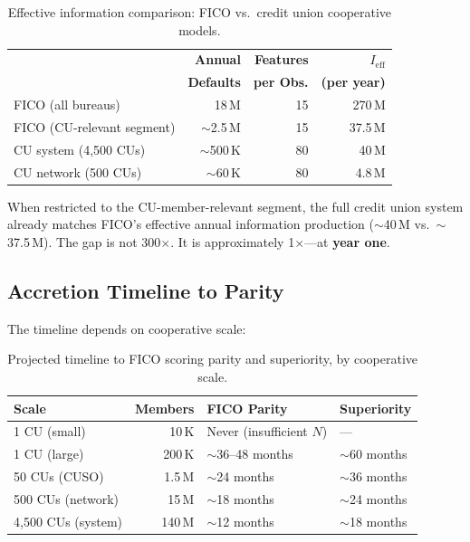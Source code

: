 \documentclass[11pt,twocolumn]{article}
\begin{document}
\begin{table}[H]
\centering
\small
\begin{tabular}{@{}lrrr@{}}
\toprule
 & \textbf{Annual} & \textbf{Features} & \textbf{$I_{\text{eff}}$} \\
 & \textbf{Defaults} & \textbf{per Obs.} & \textbf{(per year)} \\
\midrule
FICO (all bureaus)           & 18\,M   & 15  & 270\,M \\
FICO (CU-relevant segment)  & $\sim$2.5\,M  & 15  & 37.5\,M \\
CU system (4{,}500 CUs)     & $\sim$500\,K  & 80  & 40\,M \\
CU network (500 CUs)        & $\sim$60\,K   & 80  & 4.8\,M \\
\bottomrule
\end{tabular}
\caption{Effective information comparison: FICO vs.\ credit union cooperative models.}
\label{tab:ieff}
\end{table}

When restricted to the CU-member-relevant segment, the full credit union system already matches FICO's effective annual information production ($\sim$40\,M vs.\ $\sim$37.5\,M). The gap is not 300$\times$. It is approximately 1$\times$---at \textbf{year one}.

\subsection{Accretion Timeline to Parity}

The timeline depends on cooperative scale:

\begin{table}[H]
\centering
\small
\begin{tabular}{@{}lrll@{}}
\toprule
\textbf{Scale} & \textbf{Members} & \textbf{FICO Parity} & \textbf{Superiority} \\
\midrule
1 CU (small)         & 10\,K   & Never (insufficient $N$) & --- \\
1 CU (large)         & 200\,K  & $\sim$36--48 months      & $\sim$60 months \\
50 CUs (CUSO)        & 1.5\,M  & $\sim$24 months          & $\sim$36 months \\
500 CUs (network)    & 15\,M   & $\sim$18 months          & $\sim$24 months \\
4{,}500 CUs (system) & 140\,M  & $\sim$12 months          & $\sim$18 months \\
\bottomrule
\end{tabular}
\caption{Projected timeline to FICO scoring parity and superiority, by cooperative scale.}
\label{tab:timeline}
\end{table}
\end{document}
